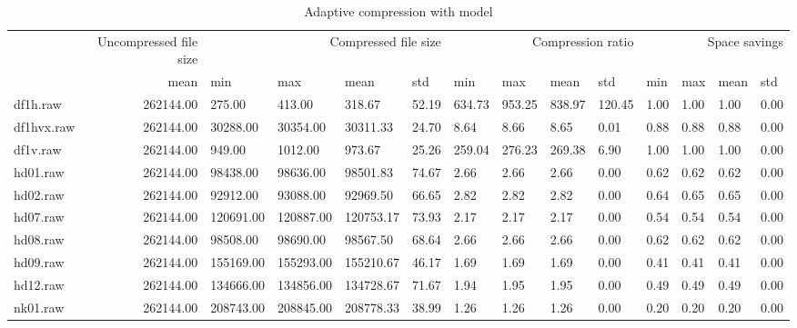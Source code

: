 \begin{table}
\caption{Adaptive compression with model}
\begin{tabular}{lrllllllllllll}
 & Uncompressed file size & \multicolumn{4}{r}{Compressed file size} & \multicolumn{4}{r}{Compression ratio} & \multicolumn{4}{r}{Space savings} \\
 & mean & min & max & mean & std & min & max & mean & std & min & max & mean & std \\
df1h.raw & 262144.00 & 275.00 & 413.00 & 318.67 & 52.19 & 634.73 & 953.25 & 838.97 & 120.45 & 1.00 & 1.00 & 1.00 & 0.00 \\
df1hvx.raw & 262144.00 & 30288.00 & 30354.00 & 30311.33 & 24.70 & 8.64 & 8.66 & 8.65 & 0.01 & 0.88 & 0.88 & 0.88 & 0.00 \\
df1v.raw & 262144.00 & 949.00 & 1012.00 & 973.67 & 25.26 & 259.04 & 276.23 & 269.38 & 6.90 & 1.00 & 1.00 & 1.00 & 0.00 \\
hd01.raw & 262144.00 & 98438.00 & 98636.00 & 98501.83 & 74.67 & 2.66 & 2.66 & 2.66 & 0.00 & 0.62 & 0.62 & 0.62 & 0.00 \\
hd02.raw & 262144.00 & 92912.00 & 93088.00 & 92969.50 & 66.65 & 2.82 & 2.82 & 2.82 & 0.00 & 0.64 & 0.65 & 0.65 & 0.00 \\
hd07.raw & 262144.00 & 120691.00 & 120887.00 & 120753.17 & 73.93 & 2.17 & 2.17 & 2.17 & 0.00 & 0.54 & 0.54 & 0.54 & 0.00 \\
hd08.raw & 262144.00 & 98508.00 & 98690.00 & 98567.50 & 68.64 & 2.66 & 2.66 & 2.66 & 0.00 & 0.62 & 0.62 & 0.62 & 0.00 \\
hd09.raw & 262144.00 & 155169.00 & 155293.00 & 155210.67 & 46.17 & 1.69 & 1.69 & 1.69 & 0.00 & 0.41 & 0.41 & 0.41 & 0.00 \\
hd12.raw & 262144.00 & 134666.00 & 134856.00 & 134728.67 & 71.67 & 1.94 & 1.95 & 1.95 & 0.00 & 0.49 & 0.49 & 0.49 & 0.00 \\
nk01.raw & 262144.00 & 208743.00 & 208845.00 & 208778.33 & 38.99 & 1.26 & 1.26 & 1.26 & 0.00 & 0.20 & 0.20 & 0.20 & 0.00 \\
\end{tabular}
\end{table}
